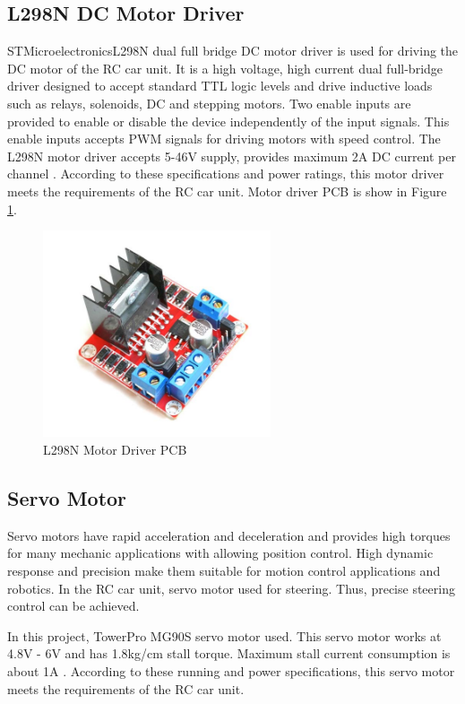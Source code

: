 \subsection{L298N DC Motor Driver} \label{sec_l298n_driver}
STMicroelectronics\texttrademark\;L298N dual full bridge DC motor driver is used for driving the DC motor of the RC car unit. It is a high voltage, high current dual full-bridge driver designed to accept standard TTL logic levels and drive inductive loads such as relays, solenoids, DC and stepping motors. Two enable inputs are provided to enable or disable the device independently of the input signals. This enable inputs accepts PWM signals for driving motors with speed control. The L298N motor driver accepts 5-46V supply, provides maximum 2A DC current per channel \cite{Two}. According to these specifications and power ratings, this motor driver meets the requirements of the RC car unit. Motor driver PCB is show in Figure \ref{fig:l298n_pcb}.

\begin{figure}[!htbp]
    \centering
    \includegraphics[width=0.6\textwidth]{Imgs/l298n.png}
    \caption{\label{fig:l298n_pcb}L298N Motor Driver PCB}
\end{figure}

\subsection{Servo Motor}
Servo motors have rapid acceleration and deceleration and provides high torques for many mechanic applications with allowing position control. High dynamic response and precision make them suitable for motion control applications and robotics. In the RC car unit, servo motor used for steering. Thus, precise steering control can be achieved.

In this project, TowerPro\texttrademark\; MG90S servo motor used. This servo motor works at 4.8V - 6V and has 1.8kg/cm stall torque. Maximum stall current consumption is about 1A \cite{Ref_servo_mg90s}. According to these running and power specifications, this servo motor meets the requirements of the RC car unit.

